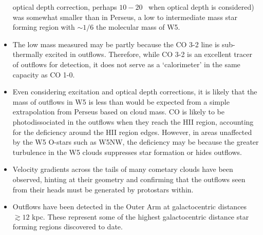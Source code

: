 \begin{itemize}
      optical depth correction, perhaps $10-20$ \msun\ when optical depth is
      considered) was somewhat smaller than in Perseus, a low to intermediate
      mass star forming region with $\sim 1/6$ the molecular mass of W5. 
    \item The low mass measured may be partly because the CO 3-2 line is
      sub-thermally excited in outflows.  Therefore, while CO 3-2 is an
      excellent tracer of outflows for detection, it does not serve as a
      `calorimeter' in the same capacity as CO 1-0.
    \item Even considering excitation and optical depth corrections, it is
      likely that the mass of outflows in W5 is less than would be expected
      from a simple extrapolation from Perseus based on cloud mass. CO is
      likely to be photodissociated in the outflows when they reach the HII
      region, accounting for the deficiency around the HII region edges.
      However, in areas unaffected by the W5 O-stars such as W5NW, the
      deficiency may be because the greater turbulence in the W5 clouds
      suppresses star formation or hides outflows.
    \item Velocity gradients across the tails of many cometary clouds have been
      observed, hinting at their geometry and confirming that the outflows seen
      from their heads must be generated by protostars within.
    \item Outflows have been detected in the Outer Arm at galactocentric
      distances $\gtrsim12$ kpc.  These represent some of the highest
      galactocentric distance star forming regions discovered to date.
\end{itemize}


